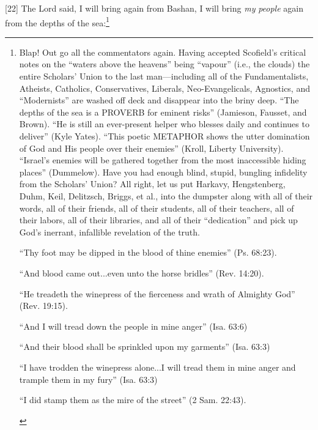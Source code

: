 [22] \textcolor[rgb]{0.00,0.00,1.00}{The Lord said, I will bring again from Bashan, I will bring \emph{my} \emph{people} again from the depths of the sea:}\footnote{Blap! Out go all the commentators again. Having accepted Scofield’s critical notes on the “waters above the heavens” being “vapour” (i.e., the clouds) the entire Scholars’ Union to the last man—including all of the Fundamentalists, Atheists, Catholics, Conservatives, Liberals, Neo-Evangelicals, Agnostics, and “Modernists” are washed off deck and disappear into the briny deep. “The depths of the sea is a PROVERB for eminent risks” (Jamieson, Fausset, and Brown). “He is still an ever-present helper who blesses daily and continues to deliver” (Kyle Yates). “This poetic METAPHOR shows the utter domination of God and His people over their enemies” (Kroll, Liberty University). “Israel’s enemies will be gathered together from the most inaccessible hiding places” (Dummelow). Have you had enough blind, stupid, bungling infidelity from the Scholars’ Union? All right, let us put Harkavy, Hengstenberg, Duhm, Keil, Delitzsch, Briggs, et al., into the dumpster along with all of their words, all of their friends, all of their students, all of their teachers, all of their labors, all of their libraries, and all of their “dedication” and pick up God’s inerrant, infallible revelation of the truth.  \cite{Ruckman1992Psalms}  
\begin{compactenum}
\item “Thy foot may be dipped in the blood of thine enemies” (Ps. 68:23).
\item “And blood came out...even unto the horse bridles” (Rev. 14:20).
\item “He treadeth the winepress of the fierceness and wrath of Almighty God” (Rev. 19:15).
\item “And I will tread down the people in mine anger” (Isa. 63:6)
\item “And their blood shall be sprinkled upon my garments” (Isa. 63:3)
\item  “I have trodden the winepress alone...I will tread them in mine anger and trample
them in my fury” (Isa. 63:3)
\item “I did stamp them as the mire of the street” (2 Sam. 22:43).
\end{compactenum} }
